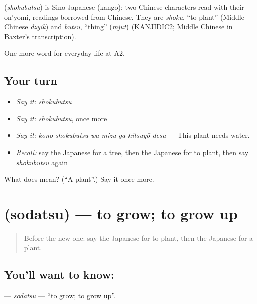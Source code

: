\begin{cousinweb}
\textbf{} (\emph{shokubutsu}) is Sino-Japanese (kango): two Chinese characters read with their on'yomi, readings borrowed from Chinese. They are \emph{shoku}, \textquotedblleft{}to plant\textquotedblright{} (Middle Chinese \emph{dzyik}) and \emph{butsu}, \textquotedblleft{}thing\textquotedblright{} (\emph{mjut}) (KANJIDIC2; Middle Chinese in Baxter's transcription).
\end{cousinweb}

\begin{grammarlens}[title={What you've built}]
One more word for everyday life at A2.
\end{grammarlens}

\subsection*{Your turn}
\begin{itemize}
\raggedright
  \item \emph{Say it:} \emph{shokubutsu}
  \item \emph{Say it:} \emph{shokubutsu}, once more
  \item \emph{Say it:} \emph{kono shokubutsu wa mizu ga hitsuyō desu} — This plant needs water.
  \item \emph{Recall:} say the Japanese for a tree, then the Japanese for to plant, then say \emph{shokubutsu} again
\end{itemize}

\begin{tcolorbox}[breakable,colback=teal!4,colframe=teal!35!black,title={Before you move on}]
What does  mean? (\textquotedblleft{}A plant\textquotedblright{}.) Say it once more.
\end{tcolorbox}
\section[\texorpdfstring{\ja{そだつ} (sodatsu)}{そだつ (sodatsu)}]{ (sodatsu) — to grow; to grow up}

\label{lesson:JA-C210-sodatsu}



\begin{quote}
Before the new one: say the Japanese for to plant, then the Japanese for a plant.
\end{quote}

\subsection*{You'll want to know: }
\textbf{} — \emph{sodatsu} — \textquotedblleft{}to grow; to grow up\textquotedblright{}.

